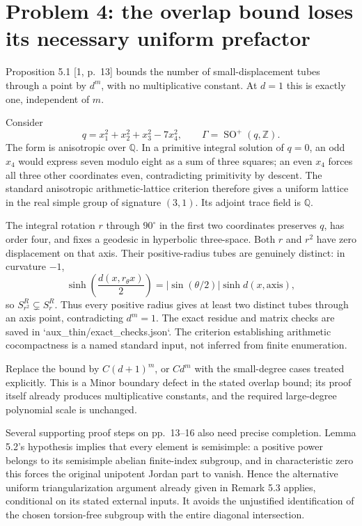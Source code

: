 \documentclass[10pt]{article}
\begin{document}
\section*{Problem 4: the overlap bound loses its necessary uniform prefactor}
Proposition 5.1 [1, p. 13] bounds the number of small-displacement tubes through a point by \(d^m\), with no multiplicative constant. At \(d=1\) this is exactly one, independent of \(m\).\par
Consider \[q=x_1^2+x_2^2+x_3^2-7x_4^2,\qquad
 \Gamma=\operatorname{SO}^+(q,\mathbb Z).\] The form is anisotropic over \(\mathbb Q\). In a primitive integral solution of \(q=0\), an odd \(x_4\) would express seven modulo eight as a sum of three squares; an even \(x_4\) forces all three other coordinates even, contradicting primitivity by descent. The standard anisotropic arithmetic-lattice criterion therefore gives a uniform lattice in the real simple group of signature \((3,1)\). Its adjoint trace field is \(\mathbb Q\).\par
The integral rotation \(r\) through \(90^\circ\) in the first two coordinates preserves \(q\), has order four, and fixes a geodesic in hyperbolic three-space. Both \(r\) and \(r^2\) have zero displacement on that axis. Their positive-radius tubes are genuinely distinct: in curvature \(-1\), \[\sinh\!\left(\frac{d(x,r_\theta x)}2\right)
 =|\sin(\theta/2)|\sinh d(x,\mathrm{axis}),\] so \(S_{r^2}^{R}\subsetneq S_r^{R}\). Thus every positive radius gives at least two distinct tubes through an axis point, contradicting \(d^m=1\). The exact residue and matrix checks are saved in `aux\_thin/exact\_checks.json`. The criterion establishing arithmetic cocompactness is a named standard input, not inferred from finite enumeration.\par
Replace the bound by \(C(d+1)^m\), or \(Cd^m\) with the small-degree cases treated explicitly. This is a Minor boundary defect in the stated overlap bound; its proof itself already produces multiplicative constants, and the required large-degree polynomial scale is unchanged.\par
Several supporting proof steps on pp. 13–16 also need precise completion. Lemma 5.2’s hypothesis implies that every element is semisimple: a positive power belongs to its semisimple abelian finite-index subgroup, and in characteristic zero this forces the original unipotent Jordan part to vanish. Hence the alternative uniform triangularization argument already given in Remark 5.3 applies, conditional on its stated external inputs. It avoids the unjustified identification of the chosen torsion-free subgroup with the entire diagonal intersection.\par
\end{document}
